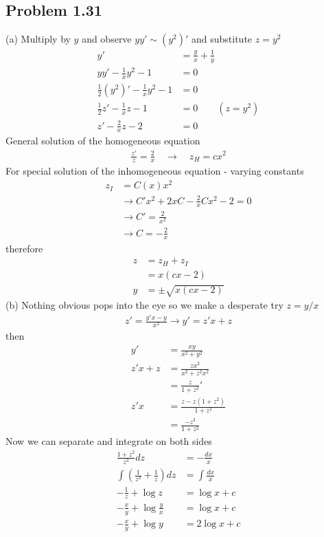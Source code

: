 \documentclass[10pt,a4paper]{book}
\theoremstyle{definition}
\begin{document}
\subsection{Problem 1.31}
(a) Multiply by $y$ and observe $yy'\sim(y^2)'$ and substitute $z=y^2$
\begin{align}
y'&=\frac{y}{x}+\frac{1}{y}\\
yy'-\frac{1}{x}y^2-1&=0\\
\frac{1}{2}(y^2)'-\frac{1}{x}y^2-1&=0\\
\frac{1}{2}z'-\frac{1}{x}z-1&=0\qquad(z=y^2)\\
z'-\frac{2}{x}z-2&=0
\end{align}
General solution of the homogeneous equation
\begin{align}
\frac{z'}{z}=\frac{2}{x}\quad\rightarrow\quad z_H=cx^2
\end{align}
For special solution of the inhomogeneous equation - varying constants
\begin{align}
z_I&=C(x)x^2\\
&\rightarrow C'x^2+2xC-\frac{2}{x}Cx^2-2=0\\
&\rightarrow C'=\frac{2}{x^2}\\
&\rightarrow C=-\frac{2}{x}
\end{align}
therefore
\begin{align}
z&=z_H+z_I\\
&=x(cx-2)\\
y&=\pm\sqrt{x(cx-2)}
\end{align}
(b) Nothing obvious pops into the eye so we make a desperate try $z=y/x$
\begin{align}
z'=\frac{y'x-y}{x^2}\rightarrow y'=z'x+z
\end{align}
then
\begin{align}
y'&=\frac{xy}{x^2+y^2}\\
z'x+z
&=\frac{zx^2}{x^2+z^2x^2}\\
&=\frac{z}{1+z^2}'\\
z'x&=\frac{z-z(1+z^2)}{1+z^2}\\
&=\frac{-z^3}{1+z^2}
\end{align}
Now we can separate and integrate on both sides
\begin{align}
\frac{1+z^2}{z^3}dz&=-\frac{dx}{x}\\
\int\left(\frac{1}{z^2}+\frac{1}{z}\right)dz&=\int\frac{dx}{x}\\
-\frac{1}{z}+\log z&=\log{x}+c\\
-\frac{x}{y}+\log\frac{y}{x}&=\log{x}+c\\
-\frac{x}{y}+\log y&=2\log{x}+c
\end{align}
\end{document}
